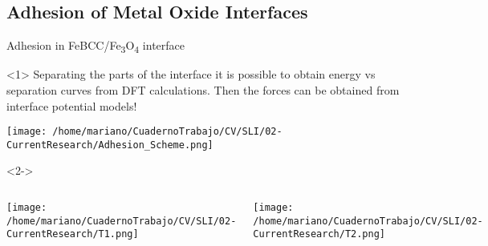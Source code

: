 \subsection{Adhesion of Metal Oxide Interfaces}
\begin{frame}{
    Adhesion in FeBCC/Fe\textsubscript{3}O\textsubscript{4}
    interface 
  }

  \begin{onlyenv}<1>
    Separating the parts of the interface it is
    possible to obtain energy vs separation curves 
    from DFT calculations.
    Then the forces can be obtained from interface 
    potential models!
  \end{onlyenv}
  \begin{center}
  \texttt{[image: /home/mariano/CuadernoTrabajo/CV/SLI/02-CurrentResearch/Adhesion\_Scheme.png]}
  \end{center}
\begin{onlyenv}<2->
\begin{columns}
    \begin{center}
    \texttt{[image: /home/mariano/CuadernoTrabajo/CV/SLI/02-CurrentResearch/T1.png]}
    \end{center}
    \begin{center}
    \texttt{[image: /home/mariano/CuadernoTrabajo/CV/SLI/02-CurrentResearch/T2.png]}
    \end{center}
\end{columns}
\end{onlyenv}
\end{frame}
